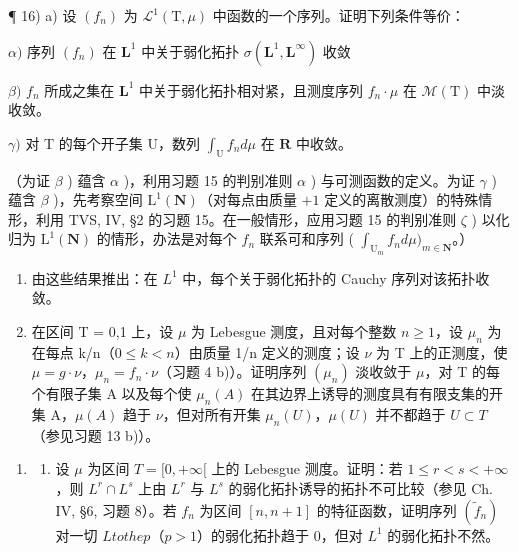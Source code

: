 ¶ 16) a) 设 \((f_n)\) 为 \(\mathcal{L}^1(\mathrm{T},\mu)\) 中函数的一个序列。证明下列条件等价：

\(\alpha)\) 序列 \((f_n)\) 在 \(\mathbf{L}^1\) 中关于弱化拓扑 \(\sigma(\mathbf{L}^1, \mathbf{L}^\infty)\) 收敛

\(\beta)\) \(f_{n}\) 所成之集在 \(\mathbf{L}^{1}\) 中关于弱化拓扑相对紧，且测度序列 \(f_{n} \cdot \mu\) 在 \(\mathcal{M}(\mathrm{T})\) 中淡收敛。

\(\gamma)\) 对 T 的每个开子集 U，数列 \(\int_{\mathrm{U}} f_n d\mu\) 在 \(\mathbf{R}\) 中收敛。

（为证 \(\beta\) ) 蕴含 \(\alpha\) )，利用习题 15 的判别准则 \(\alpha\) ) 与可测函数的定义。为证 \(\gamma\) ) 蕴含 \(\beta\) )，先考察空间 \(\mathrm{L}^1(\mathbf{N})\)（对每点由质量 \(+1\) 定义的离散测度）的特殊情形，利用 TVS, IV, §2 的习题 15。在一般情形，应用习题 15 的判别准则 \(\zeta\) ) 以化归为 \(\mathrm{L}^1(\mathbf{N})\) 的情形，办法是对每个 \(f_n\) 联系可和序列 ( \(\int_{\mathrm{U}_m} f_n d\mu)_{m \in \mathbf{N}}\)。）

\begin{enumerate}
\def\labelenumi{\alph{enumi})}
\setcounter{enumi}{1}
\item
  由这些结果推出：在 \(L^{1}\) 中，每个关于弱化拓扑的 Cauchy 序列对该拓扑收敛。
\item
  在区间 T = {}0,1{} 上，设 \(\mu\) 为 Lebesgue 测度，且对每个整数 \(n \geqslant 1\)，设 \(\mu_{n}\) 为在每点 k/n（\(0 \leqslant k < n\)）由质量 1/n 定义的测度；设 \(\nu\) 为 T 上的正测度，使 \(\mu = g \cdot \nu\)，\(\mu_{n} = f_{n} \cdot \nu\)（习题 4 b)）。证明序列 \((\mu_{n})\) 淡收敛于 \(\mu\)，对 T 的每个有限子集 A 以及每个使 \(\mu_{n}(A)\) 在其边界上诱导的测度具有有限支集的开集 A，\(\mu(A)\) 趋于 \(\nu\)，但对所有开集 \(\mu_{n}(U)\)，\(\mu(U)\) 并不都趋于 \(U \subset T\)（参见习题 13 b)）。
\end{enumerate}

\begin{enumerate}
\def\labelenumi{\arabic{enumi})}
\setcounter{enumi}{16}
\tightlist
\item
  \begin{enumerate}
  \def\labelenumii{\alph{enumii})}
  \tightlist
  \item
    设 \(\mu\) 为区间 \(T = [0, +\infty[\) 上的 Lebesgue 测度。证明：若 \(1 \leqslant r < s < +\infty\)，则 \(L^r \cap L^s\) 上由 \(L^r\) 与 \(L^s\) 的弱化拓扑诱导的拓扑不可比较（参见 Ch. IV, §6, 习题 8）。若 \(f_n\) 为区间 \([n, n+1]\) 的特征函数，证明序列 \((\widetilde{f}_n)\) 对一切 \(L to the p\)（\(p > 1\)）的弱化拓扑趋于 0，但对 \(L^1\) 的弱化拓扑不然。
  \end{enumerate}
\end{enumerate}

